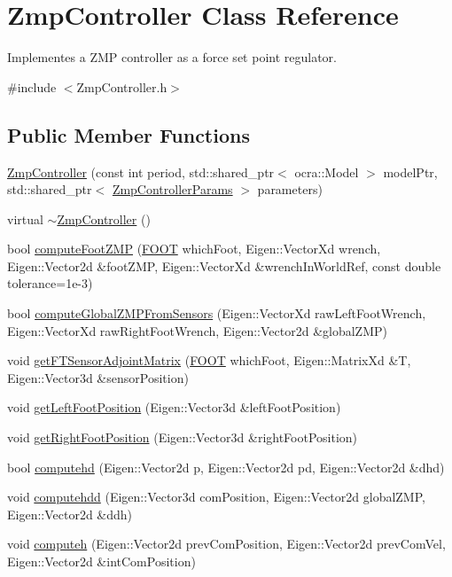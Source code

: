 \hypertarget{classZmpController}{}\section{Zmp\+Controller Class Reference}
\label{classZmpController}


Implementes a Z\+MP controller as a force set point regulator.  




{\ttfamily \#include $<$Zmp\+Controller.\+h$>$}

\subsection*{Public Member Functions}
\begin{DoxyCompactItemize}
\item 
\hyperlink{classZmpController_a4c47608f6d62b6b490808816879c01b7}{Zmp\+Controller} (const int period, std\+::shared\+\_\+ptr$<$ ocra\+::\+Model $>$ model\+Ptr, std\+::shared\+\_\+ptr$<$ \hyperlink{structZmpControllerParams}{Zmp\+Controller\+Params} $>$ parameters)
\item 
virtual \hyperlink{classZmpController_af308a70e70cfe9a1e9569606da8b1739}{$\sim$\+Zmp\+Controller} ()
\item 
bool \hyperlink{classZmpController_a6fd41771d83a31bd190f4031f82649e0}{compute\+Foot\+Z\+MP} (\hyperlink{ZmpController_8h_a4b6a8e135f90bd56e5a57a60efb42529}{F\+O\+OT} which\+Foot, Eigen\+::\+Vector\+Xd wrench, Eigen\+::\+Vector2d \&foot\+Z\+MP, Eigen\+::\+Vector\+Xd \&wrench\+In\+World\+Ref, const double tolerance=1e-\/3)
\item 
bool \hyperlink{classZmpController_aae5cc381a922206dad10ba2d425992ce}{compute\+Global\+Z\+M\+P\+From\+Sensors} (Eigen\+::\+Vector\+Xd raw\+Left\+Foot\+Wrench, Eigen\+::\+Vector\+Xd raw\+Right\+Foot\+Wrench, Eigen\+::\+Vector2d \&global\+Z\+MP)
\item 
void \hyperlink{classZmpController_aad272bd33de6fad489ea99618a7e9afa}{get\+F\+T\+Sensor\+Adjoint\+Matrix} (\hyperlink{ZmpController_8h_a4b6a8e135f90bd56e5a57a60efb42529}{F\+O\+OT} which\+Foot, Eigen\+::\+Matrix\+Xd \&T, Eigen\+::\+Vector3d \&sensor\+Position)
\item 
void \hyperlink{classZmpController_ac8e821f72c79fe86102f02c4c155ad30}{get\+Left\+Foot\+Position} (Eigen\+::\+Vector3d \&left\+Foot\+Position)
\item 
void \hyperlink{classZmpController_a815cd495f657cbd93c25610d24982e8c}{get\+Right\+Foot\+Position} (Eigen\+::\+Vector3d \&right\+Foot\+Position)
\item 
bool \hyperlink{classZmpController_a5eab881a51fb2ace1a1d494171353bc7}{computehd} (Eigen\+::\+Vector2d p, Eigen\+::\+Vector2d pd, Eigen\+::\+Vector2d \&dhd)
\item 
void \hyperlink{classZmpController_aa450c67048a44fe0dfadf07cd30165e7}{computehdd} (Eigen\+::\+Vector3d com\+Position, Eigen\+::\+Vector2d global\+Z\+MP, Eigen\+::\+Vector2d \&ddh)
\item 
void \hyperlink{classZmpController_a3e275de73186b889c755e6dc618d29bf}{computeh} (Eigen\+::\+Vector2d prev\+Com\+Position, Eigen\+::\+Vector2d prev\+Com\+Vel, Eigen\+::\+Vector2d \&int\+Com\+Position)
\end{DoxyCompactItemize}
